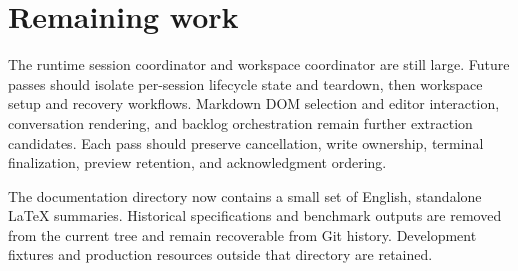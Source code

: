 \documentclass[11pt,a4paper]{article}
\begin{document}
\section{Remaining work}
The runtime session coordinator and workspace coordinator are still large.
Future passes should isolate per-session lifecycle state and teardown, then
workspace setup and recovery workflows. Markdown DOM selection and editor
interaction, conversation rendering, and backlog orchestration remain further
extraction candidates. Each pass should preserve cancellation, write ownership,
terminal finalization, preview retention, and acknowledgment ordering.

The documentation directory now contains a small set of English, standalone
LaTeX summaries. Historical specifications and benchmark outputs are removed
from the current tree and remain recoverable from Git history. Development
fixtures and production resources outside that directory are retained.
\end{document}
